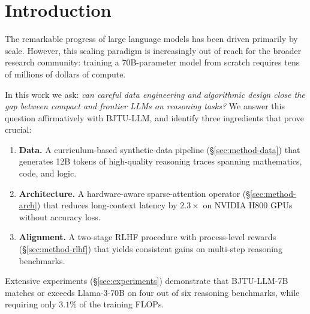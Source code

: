 \section{Introduction}
\label{sec:intro}

The remarkable progress of large language models
\citep{brown2020gpt3,touvron2023llama,openai2023gpt4} has been driven primarily
by scale. However, this scaling paradigm is increasingly out of reach for the
broader research community: training a 70B-parameter model from scratch
requires tens of millions of dollars of compute.

In this work we ask: \emph{can careful data engineering and algorithmic design
close the gap between compact and frontier LLMs on reasoning tasks?} We answer
this question affirmatively with BJTU-LLM, and identify three ingredients that
prove crucial:

\begin{contributions}
\begin{enumerate}
    \item \textbf{Data.} A curriculum-based synthetic-data pipeline
          (\S\ref{sec:method-data}) that generates 12B tokens of high-quality
          reasoning traces spanning mathematics, code, and logic.
    \item \textbf{Architecture.} A hardware-aware sparse-attention operator
          (\S\ref{sec:method-arch}) that reduces long-context latency by
          $2.3\times$ on NVIDIA H800 GPUs without accuracy loss.
    \item \textbf{Alignment.} A two-stage RLHF procedure with process-level
          rewards (\S\ref{sec:method-rlhf}) that yields consistent gains on
          multi-step reasoning benchmarks.
\end{enumerate}
\end{contributions}

Extensive experiments (\S\ref{sec:experiments}) demonstrate that BJTU-LLM-7B
matches or exceeds Llama-3-70B on four out of six reasoning benchmarks, while
requiring only $3.1$\% of the training FLOPs.
